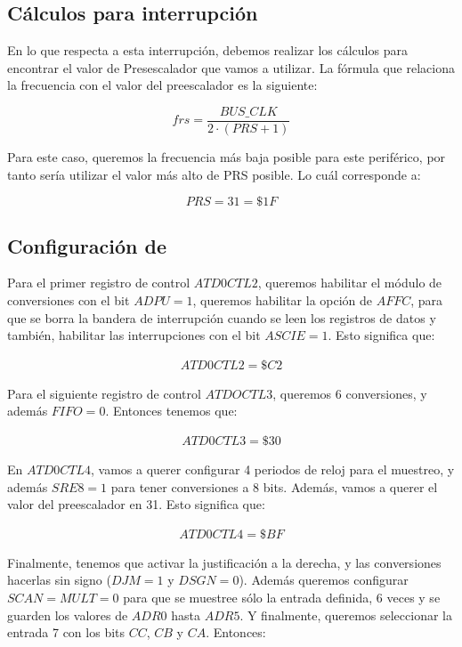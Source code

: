 \documentclass[12pt,letterpaper]{report} %
\begin{document}
\subsection{Cálculos para interrupción \subname}
En lo que respecta a esta interrupción, debemos realizar los cálculos para encontrar el valor de Presescalador que vamos a utilizar. La fórmula que relaciona la frecuencia con el valor del preescalador es la siguiente:

\begin{equation}
    frs = \frac{BUS\_CLK}{2\cdot(PRS + 1)}
\end{equation}

Para este caso, queremos la frecuencia más baja posible para este periférico, por tanto sería utilizar el valor más alto de PRS posible. Lo cuál corresponde a:

\begin{equation}
    PRS = 31 = \$1F
\end{equation}

\subsection{Configuración de \subname}
Para el primer registro de control $ATD0CTL2$, queremos habilitar el módulo de conversiones con el bit $ADPU=1$, queremos habilitar la opción de $AFFC$, para que se borra la bandera de interrupción cuando se leen los registros de datos y también, habilitar las interrupciones con el bit $ASCIE=1$. Esto significa que:

\begin{align*}
    ATD0CTL2 = \$C2
\end{align*} 

Para el siguiente registro de control $ATDOCTL3$, queremos 6 conversiones, y además $FIFO=0$. Entonces tenemos que:

\begin{align*}
    ATD0CTL3 = \$30
\end{align*} 

En $ATD0CTL4$, vamos a querer configurar 4 periodos de reloj para el muestreo, y además $SRE8=1$ para tener conversiones a 8 bits. Además, vamos a querer el valor del preescalador en 31. Esto significa que:

\begin{align*}
    ATD0CTL4 = \$BF
\end{align*} 

Finalmente, tenemos que activar la justificación a la derecha, y las conversiones hacerlas sin signo ($DJM=1$ y $DSGN=0$). Además queremos configurar $SCAN=MULT=0$ para que se muestree sólo la entrada definida, 6 veces y se guarden los valores de $ADR0$ hasta $ADR5$. Y finalmente, queremos seleccionar la entrada 7 con los bits $CC$, $CB$ y $CA$. Entonces:
\end{document}
